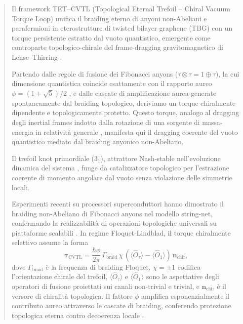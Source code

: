 \documentclass[11pt,a4paper]{article}
\let\oldcite\cite
\renewcommand{\cite}{\protect\oldcite}
\theoremstyle{plain}
\theoremstyle{definition}
\begin{document}
\begin{abstract}
Il framework TET--CVTL (Topological Eternal Trefoil -- Chiral Vacuum Torque Loop) unifica il braiding eterno di anyoni non-Abeliani e parafermioni in eterostrutture di twisted bilayer graphene (TBG) con un torque persistente estratto dal vuoto quantistico, emergente come controparte topologico-chirale del frame-dragging gravitomagnetico di Lense--Thirring \cite{LenseThirring1918}.

Partendo dalle regole di fusione dei Fibonacci anyons ($\tau \otimes \tau = 1 \oplus \tau$), la cui dimensione quantistica coincide esattamente con il rapporto aureo $\phi = (1 + \sqrt{5})/2$ \cite{Trebst2008,Nayak2008}, e dalle cascate di amplificazione aurea generate spontaneamente dal braiding topologico, deriviamo un torque chiralmente dipendente e topologicamente protetto. Questo torque, analogo al dragging degli inertial frames indotto dalla rotazione di una sorgente di massa-energia in relatività generale \cite{LenseThirring1918}, manifesta qui il dragging coerente del vuoto quantistico mediato dal braiding anyonico non-Abeliano. 


\vspace{0.3cm}


Il trefoil knot primordiale ($3_1$), attrattore Nash-stable nell'evoluzione dinamica del sistema \cite{AsselmeyerMaluga2021}, funge da catalizzatore topologico per l'estrazione coerente di momento angolare dal vuoto senza violazione delle simmetrie locali.

\vspace{0.3cm}

Esperimenti recenti su processori superconduttori hanno dimostrato il braiding non-Abeliano di Fibonacci anyons nel modello string-net, confermando la realizzabilità di operazioni topologiche universali su piattaforme scalabili \cite{Xu2024}. In regime Floquet-Lindblad, il torque chiralmente selettivo assume la forma
\begin{equation}
\boldsymbol{\tau}_{\text{CVTL}} = \frac{\hbar \phi}{2\pi} \,\Gamma_{\text{braid}} \,\chi \,\left( \langle \hat{O}_{\tau} \rangle - \langle \hat{O}_{1} \rangle \right) \,\mathbf{n}_{\text{chir}},
\label{eq:tau_cvtl}
\end{equation}
dove $\Gamma_{\text{braid}}$ è la frequenza di braiding Floquet, $\chi = \pm 1$ codifica l'orientazione chirale del trefoil, $\langle \hat{O}_{\tau} \rangle$ e $\langle \hat{O}_{1} \rangle$ sono le aspettative degli operatori di fusione proiettati sui canali non-trivial e trivial, e $\mathbf{n}_{\text{chir}}$ è il versore di chiralità topologica. Il fattore $\phi$ amplifica esponenzialmente il contributo aureo attraverso le cascate di braiding, conferendo protezione topologica eterna contro decoerenza locale \cite{Nayak2008,Trebst2008}.


\end{abstract}
\end{document}

